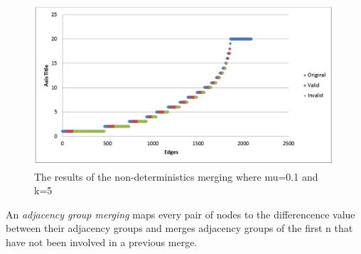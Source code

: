 \begin{figure}[htb]
  \label{merge_k_5}
  \centering
  \includegraphics[scale=0.4]{mu=0_1 k=5 non-det merge 5.png}
  \caption{The results of the non-deterministics merging where mu=0.1 and k=5}
  \label{fig:merge_k_5}
\end{figure}

\begin{definition}
An \emph{adjacency group merging} maps every pair of nodes to  the differencence value between their adjacency groups and merges adjacency groups of the first n that have not been involved in a previous merge.
\end{definition}

